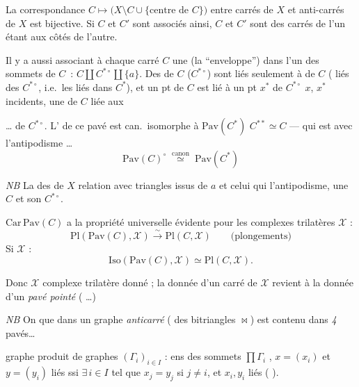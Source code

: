 \documentclass[11pt,a4paper]{article}
\begin{document}
La correspondance $C\mapsto \bigl(X\setminus C\cup\{\text{centre de }C\}\bigr)$ entre carrés de $X$ et anti-carrés de $X$ est bijective. Si $C$ et $C'$ sont associés ainsi, $C$ et $C'$ sont des carrés   de l'un étant aux côtés de l'autre.

Il y a aussi    associant à chaque carré $C$ une  (la  ``enveloppe'') dans l'un des sommets de $C$~: $C\amalg C^{*\circ}\amalg\{a\}$. Des  de $C$ ($C^{*\circ}$) sont liés seulement à \ill{} de $C$ ( liés des \ill{} $C^{*\circ}$, i.e.\ les liés dans $C^{*}$), et un pt de $C$ est lié à un pt $x^{*}$ de $C^{*\circ}$ \struck{\ill{}} \ill{} $x$, $x^{*}$ incidents, \ill{} une  de $C$ liée aux

… de $C^{*\circ}$. L' de ce pavé est can.\ isomorphe \struck{\ill{}} à $\mathrm{Pav}(C^{*})$ \ill{} \struck{\ill{}}  \struck{\ill{}} $C^{**}\simeq C$ --- qui est \ill{} avec l'antipodisme …
\[
  \mathrm{Pav}(C)^{\circ} \;\overset{\mathrm{canon}}{\simeq}\; \mathrm{Pav}(C^{*})
\]

\emph{NB} La  des \ill{} de $X$  relation avec triangles issus de $a$ et  celui qui  \add{\ill{}} l'antipodisme, une \ill{} \struck{\ill{}} $C$ et son $C^{*\circ}$.

$\mathrm{Car\,Pav}(C)$ a la propriété universelle évidente pour les complexes trilatères $\mathcal{X}$ :
\[
  \mathrm{Pl}(\mathrm{Pav}(C),\mathcal{X}) \xrightarrow{\ \sim\ } \mathrm{Pl}(C,\mathcal{X})
  \qquad\text{(plongements)}
\]
Si $\mathcal{X}$  :
\[
  \mathrm{Iso}(\mathrm{Pav}(C),\mathcal{X}) \simeq \mathrm{Pl}(C,\mathcal{X}).
\]

Donc $\mathcal{X}$ complexe trilatère donné ; \struck{\ill{}} la donnée d'un carré de $\mathcal{X}$ revient à la donnée d'un \emph{pavé pointé} \ill{} ( \ill{}…)

\emph{NB} On  \ill{} que dans un graphe \emph{anticarré} ( \ill{} des bitriangles $\bowtie$) est contenu dans \emph{4} pavés…

graphe produit de graphes $(\Gamma_i)_{i\in I}$ : ens des sommets $\prod\Gamma_i$ , $x=(x_i)$ et $y=(y_i)$ liés ssi $\exists\, i\in I$ tel que $x_j=y_j$ si $j\neq i$, et $x_i,y_i$ liés (\ill{} ).
\end{document}

